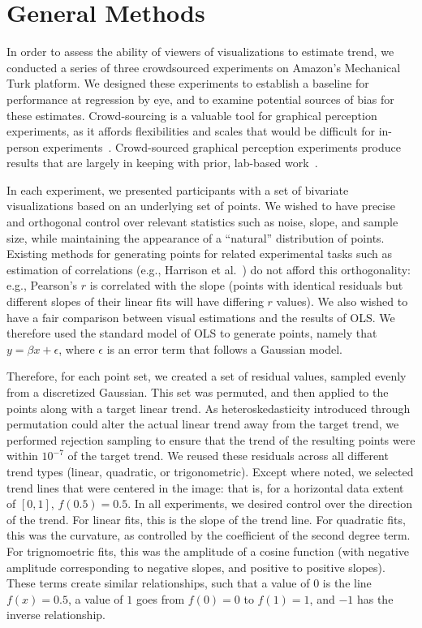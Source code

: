 \documentclass{sigchi}
\begin{document}
\section{General Methods}

In order to assess the ability of viewers of visualizations to estimate trend, we conducted a series of three crowdsourced experiments on Amazon's Mechanical Turk platform. We designed these experiments to establish a baseline for performance at regression by eye, and to examine potential sources of bias for these estimates. Crowd-sourcing is a valuable tool for graphical perception experiments, as it affords flexibilities and scales that would be difficult for in-person experiments~\cite{heer2010crowdsourcing}. Crowd-sourced graphical perception experiments produce results that are largely in keeping with prior, lab-based work~\cite{talbot2014four}.

In each experiment, we presented participants with a set of bivariate visualizations based on an underlying set of points. We wished to have precise and orthogonal control over relevant statistics such as noise, slope, and sample size, while maintaining the appearance of a ``natural'' distribution of points. Existing methods for generating points for related experimental tasks such as estimation of correlations (e.g., Harrison et al.~\cite{harrison2014ranking}) do not afford this orthogonality: e.g., Pearson's $r$ is correlated with the slope (points with identical residuals but different slopes of their linear fits will have differing $r$ values). We also wished to have a fair comparison between visual estimations and the results of OLS. We therefore used the standard model of OLS to generate points, namely that $y=\beta x + \epsilon$, where $\epsilon$ is an error term that follows a Gaussian model.

Therefore, for each point set, we created a set of residual values, sampled evenly from a discretized Gaussian. This set was permuted, and then applied to the points along with a target linear trend. As heteroskedasticity introduced through permutation could alter the actual linear trend away from the target trend, we performed rejection sampling to ensure that the trend of the resulting points were within $10^{-7}$ of the target trend. We reused these residuals across all different trend types (linear, quadratic, or trigonometric). Except where noted, we selected trend lines that were centered in the image: that is, for a horizontal data extent of $[0,1]$, $f(0.5) = 0.5$. In all experiments, we desired control over the direction of the trend. For linear fits, this is the slope of the trend line. For quadratic fits, this was the curvature, as controlled by the coefficient of the second degree term. For trignomoetric fits, this was the amplitude of a cosine function (with negative amplitude corresponding to negative slopes, and positive to positive slopes). These terms create similar relationships, such that a value of $0$ is the line $f(x)=0.5$, a value of $1$ goes from $f(0)=0$ to $f(1)=1$, and $-1$ has the inverse relationship.
\end{document}

